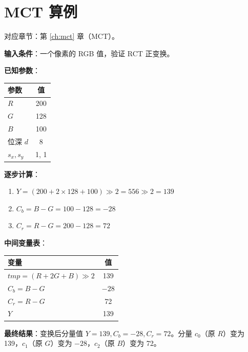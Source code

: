 
\chapter{MCT 算例}\label{ex:mct}

对应章节：第 \ref{ch:mct} 章（MCT）。

\begin{examplebox}[title={例 1：RCT 正变换}]

\textbf{输入条件}：一个像素的 RGB 值，验证 RCT 正变换。

\medskip
\textbf{已知参数}：

\begin{tabular}{@{}lc@{}}
\toprule
参数 & 值 \\
\midrule
$R$ & 200 \\
$G$ & 128 \\
$B$ & 100 \\
位深 $d$ & 8 \\
$s_x, s_y$ & 1, 1 \\
\bottomrule
\end{tabular}

\medskip
\textbf{逐步计算}：

\begin{enumerate}
  \item $Y = (200 + 2 \times 128 + 100) \gg 2 = 556 \gg 2 = 139$
  \item $C_b = B - G = 100 - 128 = -28$
  \item $C_r = R - G = 200 - 128 = 72$
\end{enumerate}

\textbf{中间变量表}：

\begin{tabular}{@{}lc@{}}
\toprule
变量 & 值 \\
\midrule
$\mathit{tmp} = (R + 2G + B) \gg 2$ & 139 \\
$C_b = B - G$ & $-28$ \\
$C_r = R - G$ & 72 \\
$Y$ & 139 \\
\bottomrule
\end{tabular}

\medskip
\textbf{最终结果}：变换后分量值 $Y = 139, C_b = -28, C_r = 72$。分量 $c_0$（原 $R$）变为 139，$c_1$（原 $G$）变为 $-28$，$c_2$（原 $B$）变为 72。
\end{examplebox}

